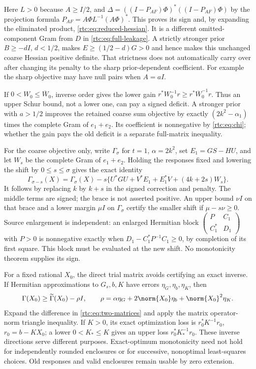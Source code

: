 \documentclass[11pt,a4paper]{article}
\numberwithin{equation}{section}
\theoremstyle{definition}\newtheorem{definition}[theorem]{Definition}
\theoremstyle{remark}\newtheorem{remark}[theorem]{Remark}
\begin{document}
Here $L>0$ because $A\ge I/2$, and
$\Delta=((I-P_{AF})\Phi)^*((I-P_{AF})\Phi)$ by the projection formula
$P_{AF}=A\Phi L^{-1}(A\Phi)^*$. This proves its sign and, by expanding
the eliminated product, \eqref{rtc:eq:reduced-hessian}.
It is a different omitted-component Gram from $D$ in
\eqref{rtc:eq:full-leakage}. A strictly stronger prior $B\ge-dI$,
$d<1/2$, makes $E\ge(1/2-d)G>0$ and hence makes this unchanged coarse
Hessian positive definite. That strictness does not automatically carry
over after changing its penalty to the sharp prior-dependent coefficient.
For example the sharp objective may have null pairs when $A=aI$.

If $0<W_0\le\overline W_0$, inverse order gives the lower gain
$r^*W_0^{-1}r\ge r^*\overline W_0^{-1}r$.
Thus an upper Schur bound, not a lower one, can pay a signed deficit.
A stronger prior with $a>1/2$ improves the retained coarse sum objective
by exactly $(2k^2-\alpha_1)$ times the complete Gram of $e_1+e_2$.
Its coefficient is nonnegative by \eqref{rtc:eq:chi}; whether the gain
pays the old deficit is a separate full-matrix inequality.

For the coarse objective only, write $\Gamma_\sigma$ for $t=1$,
$\alpha=2k^2$, set $E_1=GS-HU$, and let $W_s$ be the complete Gram of
$e_1+e_2$. Holding the responses fixed and lowering the shift by
$0\le s\le\sigma$ gives the exact identity
\begin{equation}\label{rtc:eq:two-shift}
 \Gamma_{\sigma-s}(X)=\Gamma_\sigma(X)
 -s\{U^*GU+V^*E_1+E_1^*V+(4k+2s)W_s\}.
\end{equation}
It follows by replacing $k$ by $k+s$ in the signed correction and penalty.
The middle terms are signed; the brace is not asserted positive.
An upper bound $\nu I$ on that brace and a lower margin $\mu I$ on
$\Gamma_\sigma$ certify the smaller shift if $\mu-s\nu\ge0$.
Source enlargement is independent: an enlarged Hermitian block
$\left(\begin{smallmatrix}P&C_1\\C_1^*&D_1\end{smallmatrix}\right)$ with
$P>0$ is nonnegative exactly when $D_1-C_1^*P^{-1}C_1\ge0$, by
completion of its first square. This block must be evaluated at the new
shift. No monotonicity theorem supplies its sign.

For a fixed rational $X_0$, the direct trial matrix avoids certifying an
exact inverse. If Hermitian approximations to $G_s,b,K$ have errors
$\eta_G,\eta_b,\eta_K$, then
\begin{equation}\label{rtc:eq:two-round}
 \Gamma(X_0)\ge\widetilde\Gamma(X_0)-\rho I,\qquad
 \rho=\alpha\eta_G+2\norm{X_0}\eta_b+\norm{X_0}^2\eta_K.
\end{equation}
Expand the difference in \eqref{rtc:eq:two-matrices} and apply the matrix
operator-norm triangle inequality. If $K>0$, its exact optimization loss
is $r_0^*K^{-1}r_0$, $r_0=b-KX_0$; a lower $0<K_*\le K$ gives an
upper loss $r_0^*K_*^{-1}r_0$. These inverse directions serve different
purposes. Exact-optimum monotonicity need not hold for independently
rounded enclosures or for successive, nonoptimal least-squares choices.
Old responses and valid enclosures remain usable by zero extension.
\end{document}
